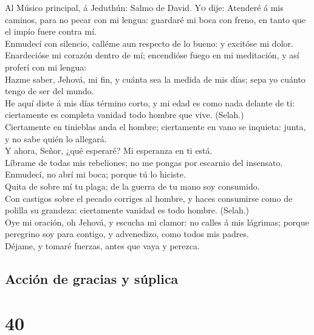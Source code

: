  Al Músico principal, á Jeduthún: Salmo de David.
\textsc{Yo} dije: Atenderé á mis caminos, para no pecar con mi lengua:
guardaré mi boca con freno, en tanto que el impío fuere contra mí.\\
 Enmudecí con silencio, calléme aun respecto de lo bueno:
y excitóse mi dolor.\\
 Enardecióse mi corazón dentro de mí; encendióse fuego en
mi meditación, y así proferí con mi lengua:\\
 Hazme saber, Jehová, mi fin, y cuánta sea la medida de
mis días; sepa yo cuánto tengo de ser del mundo.\\
 He aquí diste á mis días término corto, y mi edad es como
nada delante de ti: ciertamente es completa vanidad todo hombre que
vive. (Selah.)\\
 Ciertamente en tinieblas anda el hombre; ciertamente en
vano se inquieta: junta, y no sabe quién lo allegará.\\
 Y ahora, Señor, ¿qué esperaré? Mi esperanza en ti está.\\
 Líbrame de todas mis rebeliones; no me pongas por
escarnio del insensato.\\
 Enmudecí, no abrí mi boca; porque tú lo hiciste.\\
 Quita de sobre mí tu plaga; de la guerra de tu mano soy
consumido.\\
 Con castigos sobre el pecado corriges al hombre, y haces
consumirse como de polilla su grandeza: ciertamente vanidad es todo
hombre. (Selah.)\\
 Oye mi oración, oh Jehová, y escucha mi clamor: no
calles á mis lágrimas; porque peregrino soy para contigo, y advenedizo,
como todos mis padres.\\
 Déjame, y tomaré fuerzas, antes que vaya y perezca.

\hypertarget{acciuxf3n-de-gracias-y-suxfaplica}{%
\subsection{Acción de gracias y
súplica}\label{acciuxf3n-de-gracias-y-suxfaplica}}

\hypertarget{section-19-40}{%
\section{40}\label{section-19-40}}

